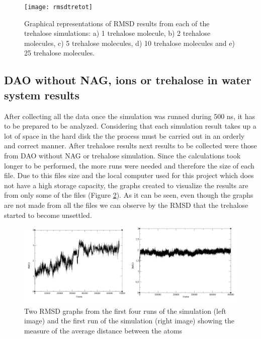 \documentclass[a4paper]{article}
\begin{document}
\begin{figure}
    \centering
    \texttt{[image: rmsdtretot]}
    \caption{Graphical representations of RMSD results from each of the trehalose simulations: a) 1 trehalose molecule, b) 2 trehalose molecules, c) 5 trehalose molecules, d) 10 trehalose molecules and e) 25 trehalose molecules.}
\label{fig:rmsdtre}
\end{figure}

\subsection{DAO without NAG, ions or trehalose in water system results}

After collecting all the data once the simulation was runned during 500 ns, it has to be prepared to be analyzed. Considering that each simulation result takes up a lot of space in the hard disk the the process must be carried out in an orderly and correct manner.
After trehalose results next results to be collected were those from DAO without NAG or trehalose simulation. Since the calculations took longer to be performed, the more runs were needed and therefore the size of each file. Due to this files size and the local computer used for this project which does not have a high storage capacity, the graphs created to visualize the results are from only some of the files (Figure \ref{fig:rmsdDAOnoNAG}). As it can be seen, even though the graphs are not made from all the files we can observe by the RMSD that the trehalose started to become unsettled. 



\begin{figure}[h]
    \centering
    \includegraphics[width = 1\hsize]{./figures/rmsdmd1}
    \caption{Two RMSD graphs from the first four runs of the simulation (left image) and the first run of the simulation (right image) showing the measure of the average distance between the atoms}
    \label{fig:rmsdDAOnoNAG}
\end{figure}
\end{document}
